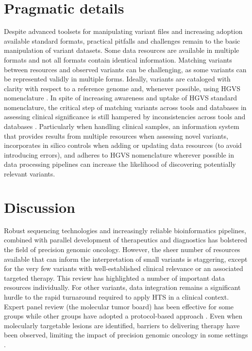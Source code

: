 \documentclass{article}
\begin{document}
\section{Pragmatic details}

Despite advanced toolsets for manipulating variant files and
increasing adoption available standard formats, practical pitfalls and
challenges remain to the basic manipulation of variant datasets. Some
data resources are available in multiple formats and not all formats
contain identical information. Matching variants between resources and
observed variants can be challenging, as some variants can be
represented validly in multiple forms. Ideally, variants are cataloged
with clarity with respect to a reference genome and, whenever
possible, using HGVS nomenclature \parencite{Den_Dunnen2016-gw}. In spite
of increasing awareness and uptake of HGVS standard nomenclature, the
critical step of matching variants across tools and databases in
assessing clinical significance is still hampered by inconsistencies
across tools and databases \parencite{Yen2017-lq}. Particularly when
handling clinical samples, an information system that provides results
from multiple resources when assessing novel variants, incorporates in
silico controls when adding or updating data resources (to avoid
introducing errors), and adheres to HGVS nomenclature wherever
possible in data processing pipelines can increase the likelihood of
discovering potentially relevant variants.

\section{Discussion}

Robust sequencing technologies and increasingly reliable
bioinformatics pipelines, combined with parallel development of
therapeutics and diagnostics has bolstered the field of precision
genomic oncology. However, the sheer number of resources available
that can inform the interpretation of small variants is staggering,
except for the very few variants with well-established clinical
relevance or an associated targeted therapy. This review has
highlighted a number of important data resources individually. For
other variants, data integration remains a significant hurdle to the
rapid turnaround required to apply HTS in a clinical context. Expert
panel review (the molecular tumor board) has been effective for some
groups \parencite{Knepper2017-no,Beltran2015-pz,Sohal2015-bi} while other
groups have adopted a protocol-based approach
\parencite{Ghazani2017-oo}. Even when molecularly targetable lesions are
identified, barriers to delivering therapy have been observed,
limiting the impact of precision genomic oncology in some settings
\parencite{Bryce2017-ht}.
\end{document}
